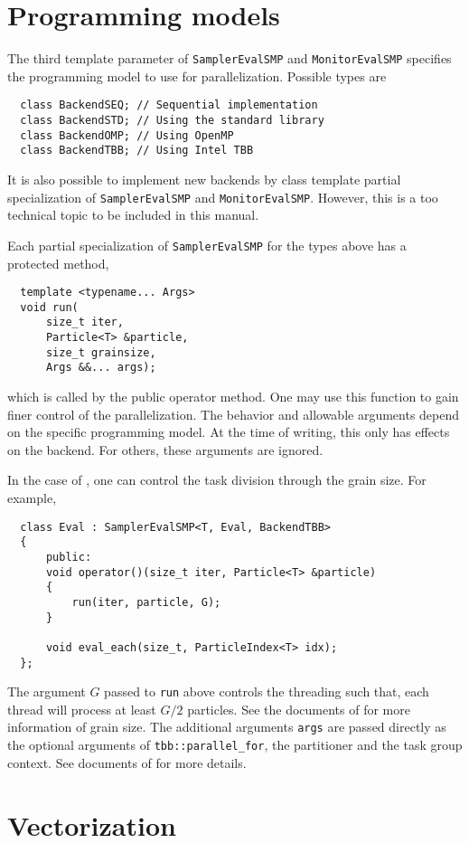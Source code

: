 \section{Programming models}
\label{sec:Programming models}

The third template parameter of \verb|SamplerEvalSMP| and \verb|MonitorEvalSMP|
specifies the programming model to use for parallelization. Possible types are
\begin{Verbatim}
  class BackendSEQ; // Sequential implementation
  class BackendSTD; // Using the standard library
  class BackendOMP; // Using OpenMP
  class BackendTBB; // Using Intel TBB
\end{Verbatim}
It is also possible to implement new backends by class template partial
specialization of \verb|SamplerEvalSMP| and \verb|MonitorEvalSMP|. However,
this is a too technical topic to be included in this manual.

Each partial specialization of \verb|SamplerEvalSMP| for the types above has a
protected method,
\begin{Verbatim}
  template <typename... Args>
  void run(
      size_t iter,
      Particle<T> &particle,
      size_t grainsize,
      Args &&... args);
\end{Verbatim}
which is called by the public operator method. One may use this function to
gain finer control of the parallelization. The behavior and allowable arguments
depend on the specific programming model. At the time of writing, this only has
effects on the \tbb backend. For others, these arguments are ignored.

In the case of \tbb, one can control the task division through the grain size.
For example,
\begin{Verbatim}
  class Eval : SamplerEvalSMP<T, Eval, BackendTBB>
  {
      public:
      void operator()(size_t iter, Particle<T> &particle)
      {
          run(iter, particle, G);
      }

      void eval_each(size_t, ParticleIndex<T> idx);
  };
\end{Verbatim}
The argument $G$ passed to \verb|run| above controls the threading such that,
each thread will process at least $G / 2$ particles. See the documents of \tbb
for more information of grain size. The additional arguments \verb|args| are
passed directly as the optional arguments of \verb|tbb::parallel_for|, the
partitioner and the task group context. See documents of \tbb for more details.

\section{Vectorization}
\label{sec:Vectorization}

